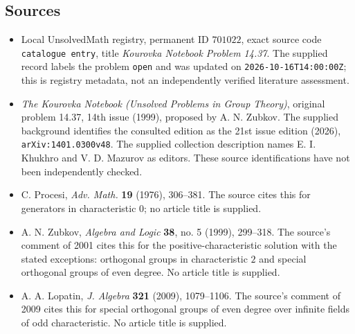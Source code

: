 \documentclass[11pt]{article}
\begin{document}
\subsection{Sources}
\begin{itemize}
\item Local UnsolvedMath registry, permanent ID \(701022\), exact source code \texttt{catalogue entry}, title \emph{Kourovka Notebook Problem 14.37}. The supplied record labels the problem \texttt{open} and was updated on \texttt{2026-10-16T14:00:00Z}; this is registry metadata, not an independently verified literature assessment.
\item \emph{The Kourovka Notebook (Unsolved Problems in Group Theory)}, original problem 14.37, 14th issue (1999), proposed by A. N. Zubkov. The supplied background identifies the consulted edition as the 21st issue edition (2026), \texttt{arXiv:1401.0300v48}. The supplied collection description names E. I. Khukhro and V. D. Mazurov as editors. These source identifications have not been independently checked.
\item C. Procesi, \emph{Adv. Math.} \textbf{19} (1976), 306--381. The source cites this for generators in characteristic \(0\); no article title is supplied.
\item A. N. Zubkov, \emph{Algebra and Logic} \textbf{38}, no. 5 (1999), 299--318. The source's comment of 2001 cites this for the positive-characteristic solution with the stated exceptions: orthogonal groups in characteristic \(2\) and special orthogonal groups of even degree. No article title is supplied.
\item A. A. Lopatin, \emph{J. Algebra} \textbf{321} (2009), 1079--1106. The source's comment of 2009 cites this for special orthogonal groups of even degree over infinite fields of odd characteristic. No article title is supplied.
\end{itemize}
\end{document}
